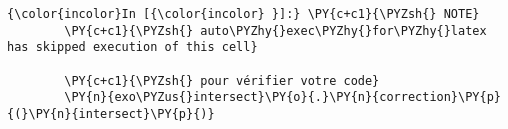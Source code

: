     \begin{Verbatim}[commandchars=\\\{\}]
{\color{incolor}In [{\color{incolor} }]:} \PY{c+c1}{\PYZsh{} NOTE}
        \PY{c+c1}{\PYZsh{} auto\PYZhy{}exec\PYZhy{}for\PYZhy{}latex has skipped execution of this cell}
        
        \PY{c+c1}{\PYZsh{} pour vérifier votre code}
        \PY{n}{exo\PYZus{}intersect}\PY{o}{.}\PY{n}{correction}\PY{p}{(}\PY{n}{intersect}\PY{p}{)}
\end{Verbatim}



    
    
    
